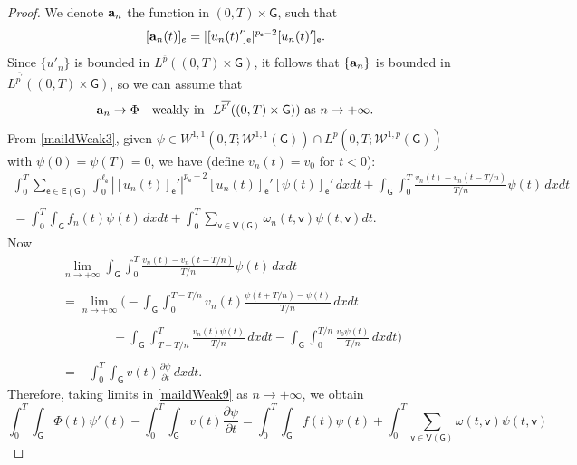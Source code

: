 \documentclass[reqno,12pt]{amsart}
\def\a{{\bf a}}
\def\e{\mathsf{e}} 	%
\def\v{\mathsf{v}}	%
\newcommand{\G}{\mathsf{G}}	%
\newcommand{\V}{\mathsf{V}}	%
\newcommand{\E}{\mathsf{E}}	%
\numberwithin{equation}{section} %
\begin{document}
\begin{proof}
 
We denote $\a_n$ the function in $(0,T) \times \G$, such that
$$[\a_n(t)]_e = \vert [u_n(t)^{\prime}]_\e \vert^{p_\e-2}  [u_n(t)^{\prime}]_\e.$$
Since $\{ u'_n \}$ is bounded in $L^{\overline {p}}((0,T) \times \G)$, it follows  that $\{ \a_n \}$ is bounded in $L^{\overline {p^{\prime}}}((0,T) \times \G)$, so we can assume that
$$\a_n\to \Phi \quad \hbox{weakly in} \ \ L^{\overline {p^{\prime}}}((0,T) \times \G)) \ \hbox{as} \ n \to +\infty.$$
From \eqref{maildWeak3}, given  $\psi \in W^{1,1}(0,T; \mathcal{W}^{1,1}(\G)) \cap L^p(0,T; \mathcal{W}^{1,\overline{p}}(\G))$ with $\psi(0) = \psi (T) =0$, we have  (define $v_n(t)=v_0$ for $t<0$):
\begin{equation}\label{maildWeak9}
\begin{array}{c}
\displaystyle \int_0^T  \sum_{\e \in\E(\G)}\int_{0}^{\ell_\e}|[u_n(t)]_\e'|^{p_\e-2}[u_n(t)]_\e'  [\psi(t)]_\e'\, d x dt+ \int_\G \int_0^T \frac{v_n(t) - v_n(t- T/n)}{T/n} \psi(t) \, dxdt\\ \\=  \displaystyle\int_0^T \int_{\G} f_n (t) \psi(t)\, dxdt+  \int_0^T \sum_{\v\in \V(\G)}\omega_n(t,\v)\psi(t,\v)dt.
\end{array}
\end{equation}
Now
$$\begin{array}{c}
\displaystyle\lim_{n \to +\infty} \int_\G \int_0^T \frac{v_n(t) - v_n(t- T/n) } {T/n} \psi(t)\, dxdt \\ \\
\displaystyle= \lim_{n \to +\infty} \Big(-  \int_\G  \int_0^{T-T/n} v_n (t) \frac{\psi(t+T/n) - \psi(t)}{T/n}\,dxdt\qquad\qquad
\\ \\
\displaystyle \qquad\qquad
+  \int_\G  \int_{T-T/n}^T \frac{v_n (t) \psi(t)}{T/n}\, dxdt - \int_\G  \int_{0}^{T/n} \frac{v_0 \psi(t)}{T/n}\, dxdt\Big)
\\ \\
\displaystyle= - \int_0^T \int_\G v(t) \frac{\partial \psi}{\partial t}\, dxdt. 
\end{array}
$$
Therefore, taking limits in \eqref{maildWeak9} as $n \to +\infty$, we obtain
\begin{equation}\label{maildWeak10}
\int_0^T \int_\G \Phi(t) \psi'(t) - \int_0^T \int_\G v(t) \frac{\partial \psi}{\partial t} = \displaystyle\int_0^T \int_{\G} f(t) \psi(t)+  \int_0^T \sum_{\v\in \V(\G)}\omega(t,\v)\psi(t,\v)
\end{equation}


\end{proof}
\end{document}
